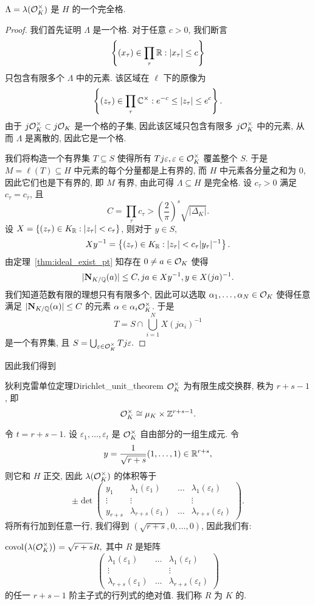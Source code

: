 \begin{theorem}{}{}
$\Lambda=\lambda({\mathcal{O}}_K^\times)$ 是 $H$ 的一个完全格.
\end{theorem}
\begin{proof}
我们首先证明 $\Lambda$ 是一个格. 对于任意 $c>0$, 我们断言 
  \[\left\{(x_\tau)\in\prod_\tau {\mathbb{R}}: |x_\tau|\le c\right\}\]
只包含有限多个 $\Lambda$ 中的元素. 该区域在 $\ell$ 下的原像为
  \[\left\{(z_\tau)\in\prod_\tau{\mathbb{C}}^\times: e^{-c}\le |z_\tau|\le e^c\right\}.\]
由于 $j{\mathcal{O}}_K^\times\subset j{\mathcal{O}}_K$ 是一个格的子集, 因此该区域只包含有限多 $j{\mathcal{O}}_K^\times$ 中的元素, 从而 $\Lambda$ 是离散的, 因此它是一个格.

我们将构造一个有界集 $T\subseteq S$ 使得所有 $Tj\varepsilon,\varepsilon\in {\mathcal{O}}_K^\times$ 覆盖整个 $S$. 于是 $M=\ell(T)\subseteq H$ 中元素的每个分量都是上有界的, 而 $H$ 中元素各分量之和为 $0$, 因此它们也是下有界的, 即 $M$ 有界, 由此可得 $\Lambda\subseteq H$ 是完全格. 设 $c_\tau>0$ 满足 $c_\tau=c_{\bar\tau}$, 且
  \[C=\prod_\tau c_\tau>\left(\frac{2}{\pi}\right)^s\sqrt{|\Delta_K|}.\]
设 $X=\left\{(z_\tau)\in K_{\mathbb{R}}: |z_\tau|<c_\tau\right\}$, 则对于 $y\in S$,
  \[Xy^{-1}=\left\{(z_\tau)\in K_{\mathbb{R}}: |z_\tau|<c_\tau|y_\tau|^{-1}\right\}.\]
由定理~\ref{thm:ideal_exist_pt} 知存在 $0\neq a\in{\mathcal{O}}_K$ 使得 
  \[|{\mathbf{N}}_{K/{\mathbb{Q}}}(a)|\le C, ja\in Xy^{-1}, y\in X(ja)^{-1}.\]
我们知道范数有限的理想只有有限多个, 因此可以选取 $\alpha_1,\dots,\alpha_N\in{\mathcal{O}}_K$ 使得任意满足 $|{\mathbf{N}}_{K/{\mathbb{Q}}}(\alpha)|\le C$ 的元素 $\alpha\in \alpha_i {\mathcal{O}}_K^\times$. 于是
  \[T=S\cap \bigcup_{i=1}^N X(j \alpha_i)^{-1}\]
是一个有界集, 且 $S=\bigcup_{\varepsilon\in{\mathcal{O}}_K^\times} Tj\varepsilon.$
\end{proof}

因此我们得到
\begin{theorem}{狄利克雷单位定理}{Dirichlet_unit_theorem}
${\mathcal{O}}_K^\times$ 为有限生成交换群, 秩为 $r+s-1$, 即
  \[{\mathcal{O}}_K^\times\cong \mu_K\times {\mathbb{Z}}^{r+s-1}.\]
\end{theorem}

令  $t=r+s-1$. 设 $\varepsilon_1,\dots,\varepsilon_t$ 是 ${\mathcal{O}}_K^\times$ 自由部分的一组生成元. 令
  \[y=\frac{1}{\sqrt{r+s}}(1,\dots,1)\in{\mathbb{R}}^{r+s},\]
则它和 $H$ 正交, 因此 $\lambda({\mathcal{O}}_K^\times)$ 的体积等于
  \[\pm\det\begin{pmatrix}
y_1 & \lambda_1(\varepsilon_1) &\dots& \lambda_1(\varepsilon_t)\\
\vdots & \vdots & & \vdots\\
y_{r+s} & \lambda_{r+s}(\varepsilon_1) &\dots& \lambda_{r+s}(\varepsilon_t)
\end{pmatrix}.\]
将所有行加到任意一行, 我们得到 $(\sqrt{r+s},0,\dots,0)$, 因此我们有:
\begin{proposition}{}{}
${\mathrm{covol}}\bigl(\lambda({\mathcal{O}}_K^\times)\bigr)=\sqrt{r+s}R,$ 其中 $R$ 是矩阵
  \[\begin{pmatrix}
\lambda_1(\varepsilon_1) &\dots& \lambda_1(\varepsilon_t)\\
\vdots & & \vdots\\
\lambda_{r+s}(\varepsilon_1) &\dots& \lambda_{r+s}(\varepsilon_t)
\end{pmatrix}\]
的任一 $r+s-1$ 阶主子式的行列式的绝对值. 我们称 $R$ 为 $K$ 的.
\end{proposition}

